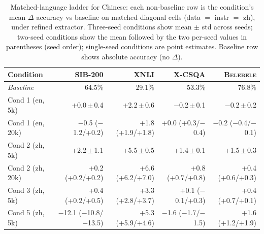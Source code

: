 \begin{table}[t]
  \centering
  \small
  \begin{tabular}{lrrrr}
    \toprule
    Condition & \textsc{SIB-200} & \textsc{XNLI} & \textsc{X-CSQA} & \textsc{Belebele} \\
    \midrule
    \textit{Baseline} & 64.5\% & 29.1\% & 53.3\% & 76.8\% \\
    Cond 1 (en, 5k) & +0.0\,$\pm$\,0.4 & +2.2\,$\pm$\,0.6 & $-$0.2\,$\pm$\,0.1 & $-$0.2\,$\pm$\,0.2 \\
    Cond 1 (en, 20k) & $-$0.5 ($-$1.2/+0.2) & +1.8 (+1.9/+1.8) & +0.0 (+0.3/$-$0.4) & $-$0.2 ($-$0.4/$-$0.1) \\
    Cond 2 (zh, 5k) & +2.2\,$\pm$\,1.1 & +5.5\,$\pm$\,0.5 & +1.4\,$\pm$\,0.1 & +1.5\,$\pm$\,0.3 \\
    Cond 2 (zh, 20k) & +0.2 (+0.2/+0.2) & +6.6 (+6.2/+7.0) & +0.8 (+0.7/+0.8) & +0.4 (+0.6/+0.3) \\
    Cond 3 (zh, 5k) & +0.4 (+0.2/+0.5) & +3.3 (+2.8/+3.7) & +0.1 ($-$0.1/+0.3) & +0.4 (+0.7/+0.1) \\
    Cond 5 (zh, 5k) & $-$12.1 ($-$10.8/$-$13.5) & +5.3 (+5.9/+4.6) & $-$1.6 ($-$1.7/$-$1.5) & +1.6 (+1.2/+1.9) \\
    \bottomrule
  \end{tabular}
  \caption{Matched-language ladder for Chinese: each non-baseline row is the condition's mean $\Delta$ accuracy vs baseline on matched-diagonal cells (data $=$ instr $=$ zh), under refined extractor. Three-seed conditions show mean $\pm$ std across seeds; two-seed conditions show the mean followed by the two per-seed values in parentheses (seed order); single-seed conditions are point estimates. Baseline row shows absolute accuracy (no $\Delta$).}
  \label{tab:matched-ladder-zh}
\end{table}

